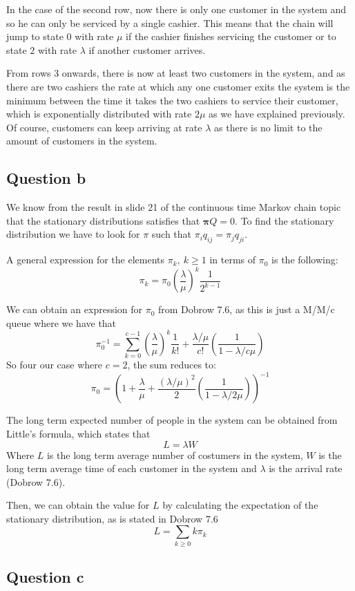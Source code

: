 \documentclass[11pt, a4paper]{article}
\begin{document}
In the case of the second row, now there is only one customer in the system and so he can only be serviced by a single cashier. This means that the chain will jump to state $0$ with rate $\mu$ if the cashier finishes servicing the customer or to state $2$ with rate $\lambda$ if another customer arrives.

From rows $3$ onwards, there is now at least two customers in the system, and as there are two cashiers the rate at which any one customer exits the system is the minimum between the time it takes the two cashiers to service their customer, which is exponentially distributed with rate $2\mu$ as we have explained previously.
Of course, customers can keep arriving at rate $\lambda$ as there is no limit to the amount of customers in the system.

\subsection*{Question b}
We know from the result in slide 21 of the continuous time Markov chain topic that the stationary distributions satisfies that $\bm{\pi}Q = 0$.
To find the stationary distribution we have to look for $\pi$ such that $\pi_i q_{ij} = \pi_j q_{ji}$.

A general expression for the elements $\pi_k, \ k\geq 1$ in terms of $\pi_0$ is the following:
\[
	\pi_k = \pi_0\left(\frac{\lambda}{\mu}\right)^k \frac{1}{2^{k-1}}
\]

We can obtain an expression for $\pi_0$ from Dobrow 7.6, as this is just a M/M/c queue where we have that
\[
	\pi_0^{-1} = \sum_{k=0}^{c-1} \left(\frac{\lambda}{\mu}\right)^k \frac{1}{k!} + \frac{\lambda / \mu}{c!} \left(\frac{1}{1 - \lambda/c\mu}\right)
\]
So four our case where $c=2$, the sum reduces to:
\[
	\pi_0 = \left(1 + \frac{\lambda}{\mu} + \frac{(\lambda/\mu)^2}{2}\left(\frac{1}{1 - \lambda/2\mu}\right)\right)^{-1}
\]

The long term expected number of people in the system can be obtained from Little's formula, which states that 
\[
	L = \lambda W
\]
Where $L$ is the long term average number of costumers in the system, $W$ is the long term average time of each customer in the system and $\lambda$ is the arrival rate (Dobrow 7.6).

Then, we can obtain the value for $L$ by calculating the expectation of the stationary distribution, as is stated in Dobrow 7.6
\[
	 L = \sum_{k \geq 0} k\pi_k
\]
\subsection*{Question c}
\end{document}
